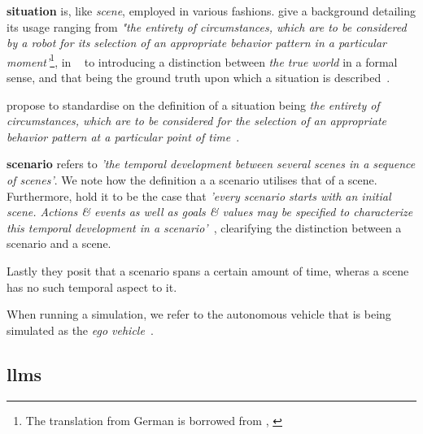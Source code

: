 \textbf{situation} is, like \textit{scene}, employed in various fashions. \citeauthor{scenes}
give a background detailing its usage ranging from \textit{"the entirety of circumstances,
    which are to be considered by a robot for its selection of an appropriate behavior pattern in a
    particular moment'}\footnote{The translation from German is borrowed from \citeauthor{scenes},
    \cite[984]{scenes}}, in  \citeauthor{scenarioTysk}~\cite[3]{scenarioTysk} to
\citeauthor{schmidtScenario} introducing a distinction between \textit{the true world} in a formal
sense, and that being the ground truth upon which a situation is
described~\cite[892]{schmidtScenario}.

\citeauthor{scenes} propose to standardise on the definition of a situation being \textit{
    the entirety of circumstances, which  are to be considered for the selection of an
    appropriate behavior pattern at a particular point of time}~\cite[985]{scenes}.

\textbf{scenario} refers to \textit{'the temporal development between several scenes in a sequence
    of scenes'}\cite[986]{scenes}. We note how the definition a a scenario utilises that of a scene.
Furthermore, \citeauthor{scenes} hold it to be the case that \textit{'every scenario starts with an
    initial scene. Actions \& events as well as goals \& values may be  specified to characterize
    this temporal development in a scenario'}~\cite[986]{scenes}, clearifying the distinction
between a scenario and a scene.

Lastly they posit that a scenario spans a certain amount of time, wheras a scene has no such
temporal aspect to it.


When running a simulation, we refer to the autonomous vehicle that is being
simulated as the \textit{ego vehicle}~\cite{egoDefinition}.





\subsection{\acrfull{llms}}

